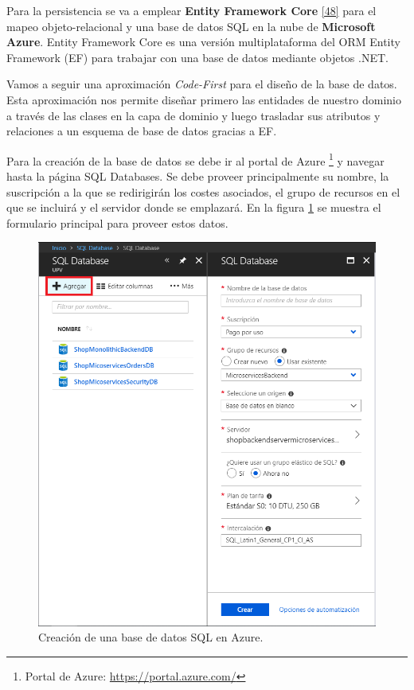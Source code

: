 \documentclass[11pt,spanish,listoffigures]{tfgetsinf}
\begin{document}
Para la persistencia se va a emplear \textbf{Entity Framework Core} \hyperlink{page.80}{[48]} para el mapeo objeto-relacional y una base de datos SQL en la nube de \textbf{Microsoft Azure}. Entity Framework Core es una versión multiplataforma del ORM Entity Framework (EF) para trabajar con una base de datos mediante objetos .NET.

Vamos a seguir una aproximación \textit{Code-First} \cite{CodeFirst} para el diseño de la base de datos. Esta aproximación nos permite diseñar primero las entidades de nuestro dominio a través de las clases en la capa de dominio y luego trasladar sus atributos y relaciones a un esquema de base de datos gracias a EF.

Para la creación de la base de datos se debe ir al portal de Azure \footnote{ Portal de Azure: \url{https://portal.azure.com/}} y navegar hasta la página SQL Databases. Se debe proveer principalmente su nombre, la suscripción a la que se redirigirán los costes asociados, el grupo de recursos en el que se incluirá y el servidor donde se emplazará. En la figura \ref{fig:CreateDB} se muestra el formulario principal para proveer estos datos.

\begin{figure}[h]
\centering
\includegraphics[scale=0.4]{CreateDB}
\caption{Creación de una base de datos SQL en Azure.}
\label{fig:CreateDB}
\end{figure}
\end{document}
